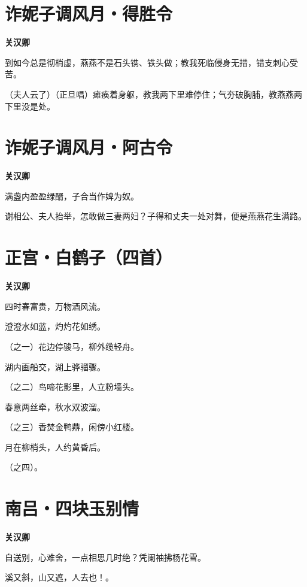 \documentclass[12pt,a4paper]{ctexbook}
\begin{document}
\section{诈妮子调风月・得胜令}
\textbf{关汉卿}\par\vspace{0.5em}
到如今总是彻梢虚，燕燕不是石头镌、铁头做；教我死临侵身无措，错支刺心受苦。\par
（夫人云了）（正旦唱）瘫痪着身躯，教我两下里难停住；气夯破胸脯，教燕燕两下里没是处。\par

\section{诈妮子调风月・阿古令}
\textbf{关汉卿}\par\vspace{0.5em}
满盏内盈盈绿醑，子合当作婢为奴。\par
谢相公、夫人抬举，怎敢做三妻两妇？子得和丈夫一处对舞，便是燕燕花生满路。\par

\section{正宫・白鹤子（四首）}
\textbf{关汉卿}\par\vspace{0.5em}
四时春富贵，万物酒风流。\par
澄澄水如蓝，灼灼花如绣。\par
（之一）花边停骏马，柳外缆轻舟。\par
湖内画船交，湖上骅骝骤。\par
（之二）鸟啼花影里，人立粉墙头。\par
春意两丝牵，秋水双波溜。\par
（之三）香焚金鸭鼎，闲傍小红楼。\par
月在柳梢头，人约黄昏后。\par
（之四）。\par

\section{南吕・四块玉别情}
\textbf{关汉卿}\par\vspace{0.5em}
自送别，心难舍，一点相思几时绝？凭阑袖拂杨花雪。\par
溪又斜，山又遮，人去也！。\par
\end{document}
